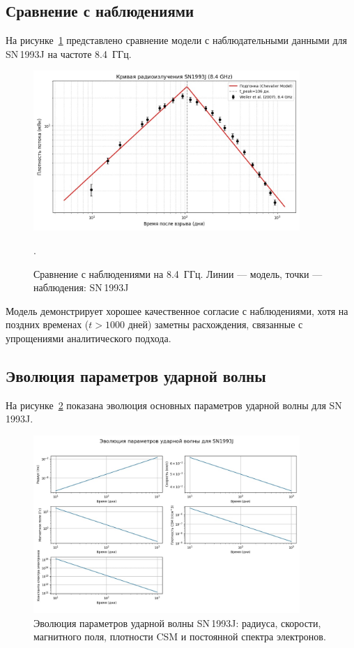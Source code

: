 \documentclass[a4paper,12pt]{extarticle}
\begin{document}
\subsection{Сравнение с наблюдениями}

На рисунке~\ref{fig:comparison} представлено сравнение модели с наблюдательными данными для SN\,1993J на частоте 8.4~ГГц.

\begin{figure}[h]
    \centering
    \includegraphics[width=0.9\textwidth]{comparison_observations.jpg}
    \caption{Сравнение с наблюдениями на 8.4~ГГц. Линии — модель, точки — наблюдения: SN\,1993J }.  %
    \label{fig:comparison}
\end{figure}
\newpage
Модель демонстрирует хорошее качественное согласие с наблюдениями, хотя на поздних временах ($t > 1000$ дней) заметны расхождения, связанные с упрощениями аналитического подхода.

\subsection{Эволюция параметров ударной волны}

На рисунке~\ref{fig:evolution} показана эволюция основных параметров ударной волны для SN\,1993J.

\begin{figure}[h]
    \centering
    \includegraphics[width=0.9\textwidth]{shock_evolution_SN1993J.jpg}
    \caption{Эволюция параметров ударной волны SN\,1993J: радиуса, скорости, магнитного поля, плотности CSM и постоянной спектра электронов.}
    \label{fig:evolution}
\end{figure}
\newpage
\end{document}
